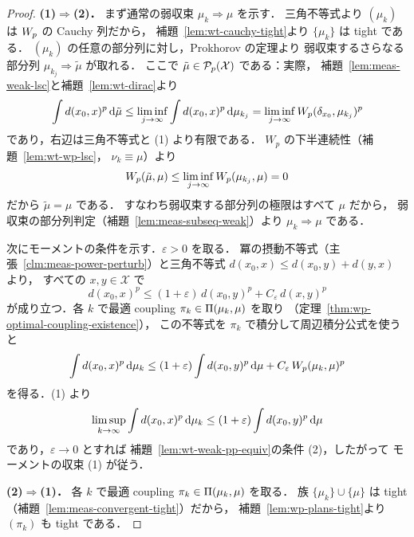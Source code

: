 \begin{proof}
  \textbf{(1)$\Rightarrow$(2)．}
  まず通常の弱収束 $\mu_k\Rightarrow\mu$ を示す．
  三角不等式より $(\mu_k)$ は $W_p$ の Cauchy 列だから，
  補題~\ref{lem:wt-cauchy-tight}より $\{\mu_k\}$ は tight である．
  $(\mu_k)$ の任意の部分列に対し，Prokhorov の定理より
  弱収束するさらなる部分列 $\mu_{k_j}\Rightarrow\tilde\mu$ が取れる．
  ここで $\tilde\mu\in\mathcal{P}_{p}(\mathcal{X})$ である：実際，
  補題~\ref{lem:meas-weak-lsc}と補題~\ref{lem:wt-dirac}より
  \[
    \int d(x_0,x)^p\,\mathrm{d}\tilde\mu
    \leq\liminf_{j\to\infty}\int d(x_0,x)^p\,\mathrm{d}\mu_{k_j}
    =\liminf_{j\to\infty}W_p(\delta_{x_0},\mu_{k_j})^p
  \]
  であり，右辺は三角不等式と (1) より有限である．
  $W_p$ の下半連続性（補題~\ref{lem:wt-wp-lsc}，
  $\nu_k\equiv\mu$）より
  \[
    W_p(\tilde\mu,\mu)
    \leq\liminf_{j\to\infty}W_p(\mu_{k_j},\mu)=0
  \]
  だから $\tilde\mu=\mu$ である．
  すなわち弱収束する部分列の極限はすべて $\mu$ だから，
  弱収束の部分列判定（補題~\ref{lem:meas-subseq-weak}）より
  $\mu_k\Rightarrow\mu$ である．

  次にモーメントの条件を示す．$\varepsilon>0$ を取る．
  冪の摂動不等式（主張~\ref{clm:meas-power-perturb}）と三角不等式
  $d(x_0,x)\leq d(x_0,y)+d(y,x)$ より，
  すべての $x,y\in\mathcal{X}$ で
  \[
    d(x_0,x)^p
    \leq(1+\varepsilon)\,d(x_0,y)^p+C_\varepsilon\,d(x,y)^p
  \]
  が成り立つ．各 $k$ で最適 coupling
  $\pi_k\in\Pi(\mu_k,\mu)$ を取り
  （定理~\ref{thm:wp-optimal-coupling-existence}），
  この不等式を $\pi_k$ で積分して周辺積分公式を使うと
  \[
    \int d(x_0,x)^p\,\mathrm{d}\mu_k
    \leq(1+\varepsilon)\int d(x_0,y)^p\,\mathrm{d}\mu
    +C_\varepsilon\,W_p(\mu_k,\mu)^p
  \]
  を得る．(1) より
  \[
    \limsup_{k\to\infty}\int d(x_0,x)^p\,\mathrm{d}\mu_k
    \leq(1+\varepsilon)\int d(x_0,y)^p\,\mathrm{d}\mu
  \]
  であり，$\varepsilon\to0$ とすれば
  補題~\ref{lem:wt-weak-pp-equiv}の条件 (2)，したがって
  モーメントの収束 (1) が従う．

  \textbf{(2)$\Rightarrow$(1)．}
  各 $k$ で最適 coupling $\pi_k\in\Pi(\mu_k,\mu)$ を取る．
  族 $\{\mu_k\}\cup\{\mu\}$ は tight
  （補題~\ref{lem:meas-convergent-tight}）だから，
  補題~\ref{lem:wp-plans-tight}より $(\pi_k)$ も tight である．


\end{proof}

